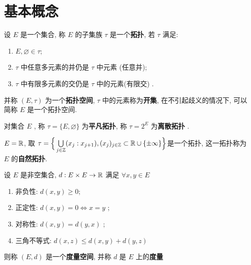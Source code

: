 \section{基本概念}

\begin{Definition}[拓扑空间]\label{def:拓扑空间}
	设 $ E $ 是一个集合, 称 $ E $ 的子集族 $ \tau $ 是一个\textbf{拓扑}, 若 $ \tau $ 满足:
	\begin{enumerate}[($ \mathrm{O}_1 $), itemindent=2.5\parindent]
		\item $ E, \varnothing\in \tau $;
		\item\label{item:O2} $ \tau $ 中任意多元素的并仍是 $ \tau $ 中元素 (任意并);
		\item\label{item:O3} $ \tau $ 中有限多元素的交仍是 $ \tau $ 中的元素(有限交) .
	\end{enumerate}
	并称 $ (E, \tau) $ 为一个\textbf{拓扑空间}, $ \tau $ 中的元素称为\textbf{开集}, 在不引起歧义的情况下, 可以简称 $ E $ 是一个拓扑空间.
\end{Definition}

\begin{Remark}\label{rmk:平凡离散}
	对集合 $ E $ , 称 $ \tau=\{ E, \varnothing \} $ 为\textbf{平凡拓扑}, 称 $ \tau=2^{E} $ 为\textbf{离散拓扑} .
\end{Remark}

\begin{Example}
	$ E=\mathbb{R} $, 取 $ \tau=\Big\{ \bigcup\limits_{j\in\mathbb{Z}}(x_{j}: x_{j+1}), (x_{j})_{j\in\mathbb{Z}}\subset \mathbb{R}\cup\{ \pm\infty \} \Big\} $是一个拓扑, 这一拓扑称为 $ E $ 的\textbf{自然拓扑}.
\end{Example}

\begin{Definition}[度量空间]\label{def:度量空间}
	设 $ E $ 是非空集合, $ d: E\times E\to \mathbb{R} $ 满足 $ \forall x, y\in E $
	\begin{enumerate}[(1)]
		\item 非负性: $ d(x, y)\geqslant 0 $;
		\item 正定性: $ d(x, y)=0\Longleftrightarrow x=y $ ;
		\item 对称性: $ d(x, y)=d(y, x) $ ;
		\item 三角不等式: $ d(x, z)\leqslant d(x, y)+d(y, z) $
	\end{enumerate}
	则称 $ (E, d) $ 是一个\textbf{度量空间}, 并称 $ d $ 是 $ E $ 上的\textbf{度量}
\end{Definition}

